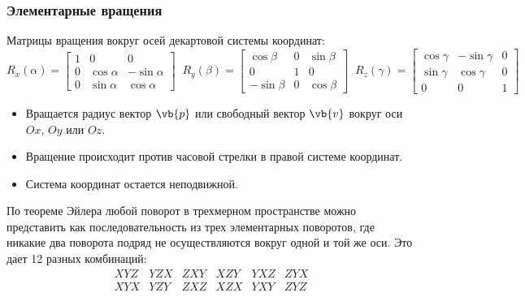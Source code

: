 \begin{frame}
  \frametitle{Элементарные вращения}
  Матрицы вращения вокруг осей декартовой системы координат:
  \begin{equation*}
    R_{x}(\alpha) = 
    \begin{bmatrix}
      1 & 0 & 0\\
      0 & \cos\alpha & -\sin\alpha\\
      0 & \sin\alpha & \cos\alpha
    \end{bmatrix}
    \;\;
    R_{y}(\beta) = 
    \begin{bmatrix}
      \cos\beta & 0 & \sin\beta \\
      0 & 1 & 0\\
      -\sin\beta & 0 & \cos\beta
    \end{bmatrix}
    \;\;
    R_{z}(\gamma) = 
    \begin{bmatrix}
      \cos\gamma & -\sin\gamma & 0\\
      \sin\gamma & \cos\gamma & 0\\
      0 & 0 & 1
    \end{bmatrix}
  \end{equation*}
  \begin{itemize}
    \item Вращается радиус вектор $\vb{p}$ или свободный вектор $\vb{v}$ вокруг оси $Ox$, $Oy$ или $Oz$.
    \item Вращение происходит против часовой стрелки в правой системе координат.
    \item Система координат остается неподвижной.
  \end{itemize}
  По теореме Эйлера любой поворот в трехмерном пространстве можно представить как последовательность из трех элементарных поворотов, где никакие два поворота подряд не осуществляются вокруг одной и той же оси. Это дает 12 разных комбинаций:
  \begin{equation*}
    \begin{matrix}
      XYZ & YZX & ZXY & XZY & YXZ & ZYX \\
      XYX & YZY & ZXZ & XZX & YXY & ZYZ
    \end{matrix}
  \end{equation*}
\end{frame}